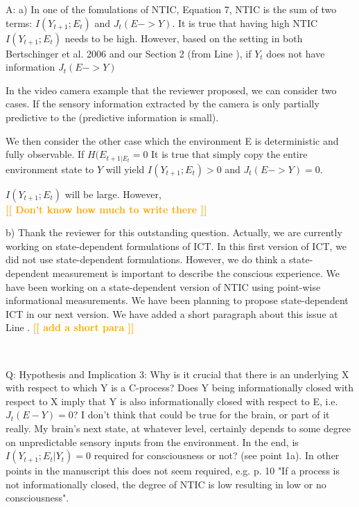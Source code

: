 \documentclass[utf8]{article}
\newcounter{cQuestion}[section]
\newenvironment{question}
    {\refstepcounter{cQuestion}\color{Blue}\noindent\newline Q\thecQuestion:}
    {~\newline}
\newenvironment{ans}  
    {\color{Black}\noindent A:}
    {~\newline}
\newcommand{\toWrite}[1]{\noindent
	\textcolor{Orange}{\textbf{[[ #1 ]]}}}
\begin{document}
    	\begin{ans}
    		\newline
    		a) In one of the fomulations of NTIC, Equation 7, NTIC is the sum of  two terms: $I(Y_{t+1}; E_t)$ and $J_t(E -> Y)$. 
    		It is true that having high NTIC $I(Y_{t+1}; E_t)$ needs to be high. However, based on the setting in both Bertschinger et al. 2006 and our Section 2 (from Line ),  if $Y_t$ does not have information $J_t(E -> Y)$
    		
    		
    		In the video camera example that the reviewer proposed, we can consider two cases. If the sensory information extracted by the camera is only partially predictive to the (predictive information \citep{bialek2001predictability} is small).
    		
    		We then consider the other case which the environment E is deterministic and fully observable. If $H(E_{t+1|E_t}=0$ 
    		It is true that simply copy the entire environment state to $Y$ will yield 
    		$I(Y_{t+1}; E_t)>0$ and $J_t(E -> Y)=0$. 
    		
    		$I(Y_{t+1}; E_t)$ will be large. However, 
    		\\
    		\toWrite{Don't know how much to write there}
    		
    		b) Thank the reviewer for this outstanding question. 
    		Actually, we are currently working on state-dependent formulations of ICT. 
    		In this first version of ICT, we did not use state-dependent formulations. 
    		However, we do think a state-dependent measurement is important to describe the conscious experience. 
    		We have been working on a state-dependent version of NTIC using point-wise informational measurements. 
    		We have been planning to propose state-dependent ICT in our next version. 
    		We have added a short paragraph about this issue at Line .
    		\toWrite{add a short para}
    		
    	\end{ans}
        
       
        
        \begin{question}
            Hypothesis and Implication 3: Why is it crucial that there is an underlying X with respect to which Y is a C-process? Does Y being informationally closed with respect to X imply that Y is also informationally closed with respect to E, i.e. $J_t(E-Y) = 0$? I don't think that could be true for the brain, or part of it really. My brain's next state, at whatever level, certainly depends to some degree on unpredictable sensory inputs from the environment. In the end, is $I(Y_{t+1}; E_t|Y_t) = 0$ required for consciousness or not? (see point 1a). In other points in the manuscript this does not seem required, e.g. p. 10 "If a process is not informationally closed, the degree of NTIC is low resulting in low or no consciousness".        
        \end{question}
        
\end{document}
